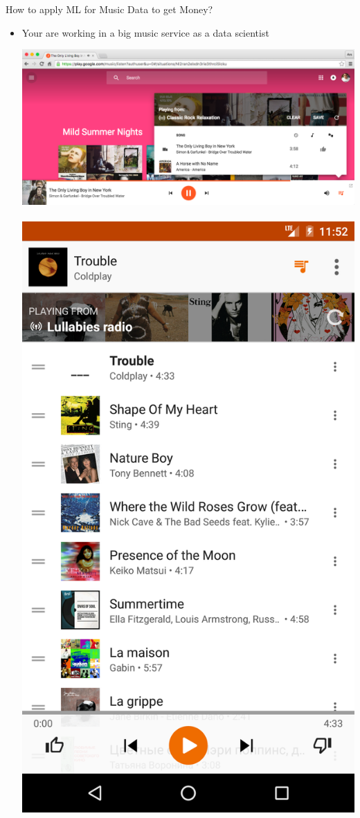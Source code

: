 \documentclass{beamer}
\begin{document}
\begin{frame}{How to apply ML for Music Data to get Money?} 
	\begin{itemize}
		\item Your are working in a big music service as a data scientist
		\begin{center}		  
		\includegraphics[scale=0.15]{img/interface}~~~\includegraphics[scale=0.044]{img/phone}

\end{center}
\end{itemize}
\end{frame}
\end{document}
